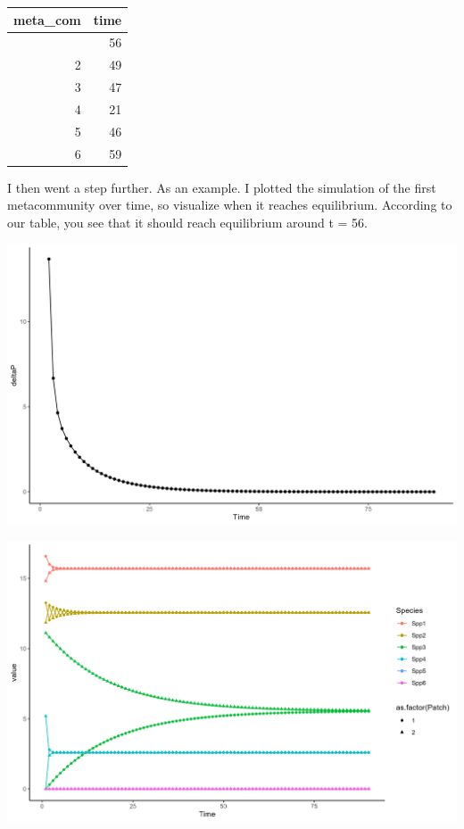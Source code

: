 \documentclass[
  letterpaper,
  DIV=11,
  numbers=noendperiod]{scrartcl}
\begin{document}
\begingroup
\fontsize{12.0pt}{14.4pt}\selectfont
\begin{longtable*}{rr}
\toprule
meta\_com & time \\ 
\midrule{} & 56 \\ 
2 & 49 \\ 
3 & 47 \\ 
4 & 21 \\ 
5 & 46 \\ 
6 & 59 \\ 
\bottomrule
\end{longtable*}
\endgroup

I then went a step further. As an example. I plotted the simulation of
the first metacommunity over time, so visualize when it reaches
equilibrium. According to our table, you see that it should reach
equilibrium around t = 56.

\includegraphics[width=9.1in,height=\textheight]{deltaP_plot.png}

\includegraphics[width=9.1in,height=\textheight]{equil_plot.png}
\end{document}
